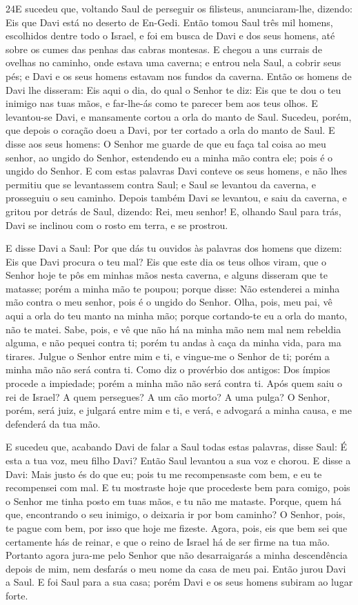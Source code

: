 \lettrine{24} E sucedeu que, voltando Saul de perseguir os
filisteus, anunciaram-lhe, dizendo: Eis que Davi está no deserto de
En-Gedi. Então tomou Saul três mil homens, escolhidos dentre
todo o Israel, e foi em busca de Davi e dos seus homens, até sobre
os cumes das penhas das cabras montesas. E chegou a uns currais
de ovelhas no caminho, onde estava uma caverna; e entrou nela Saul,
a cobrir seus pés; e Davi e os seus homens estavam nos fundos da
caverna. Então os homens de Davi lhe disseram: Eis aqui o dia,
do qual o Senhor te diz: Eis que te dou o teu inimigo nas tuas mãos,
e far-lhe-ás como te parecer bem aos teus olhos. E levantou-se Davi,
e mansamente cortou a orla do manto de Saul. Sucedeu, porém, que
depois o coração doeu a Davi, por ter cortado a orla do manto de
Saul. E disse aos seus homens: O Senhor me guarde de que eu faça
tal coisa ao meu senhor, ao ungido do Senhor, estendendo eu a minha
mão contra ele; pois é o ungido do Senhor. E com estas palavras
Davi conteve os seus homens, e não lhes permitiu que se levantassem
contra Saul; e Saul se levantou da caverna, e prosseguiu o seu
caminho. Depois também Davi se levantou, e saiu da caverna, e
gritou por detrás de Saul, dizendo: Rei, meu senhor! E, olhando Saul
para trás, Davi se inclinou com o rosto em terra, e se prostrou.

E disse Davi a Saul: Por que dás tu ouvidos às palavras dos homens
que dizem: Eis que Davi procura o teu mal? Eis que este dia
os teus olhos viram, que o Senhor hoje te pôs em minhas mãos nesta
caverna, e alguns disseram que te matasse; porém a minha mão te
poupou; porque disse: Não estenderei a minha mão contra o meu
senhor, pois é o ungido do Senhor. Olha, pois, meu pai, vê
aqui a orla do teu manto na minha mão; porque cortando-te eu a orla
do manto, não te matei. Sabe, pois, e vê que não há na minha mão nem
mal nem rebeldia alguma, e não pequei contra ti; porém tu andas à
caça da minha vida, para ma tirares. Julgue o Senhor entre
mim e ti, e vingue-me o Senhor de ti; porém a minha mão não será
contra ti. Como diz o provérbio dos antigos: Dos ímpios
procede a impiedade; porém a minha mão não será contra ti.
Após quem saiu o rei de Israel? A quem persegues? A um cão
morto? A uma pulga? O Senhor, porém, será juiz, e julgará
entre mim e ti, e verá, e advogará a minha causa, e me defenderá da
tua mão.

E sucedeu que, acabando Davi de falar a Saul todas estas
palavras, disse Saul: É esta a tua voz, meu filho Davi? Então Saul
levantou a sua voz e chorou. E disse a Davi: Mais justo és do
que eu; pois tu me recompensaste com bem, e eu te recompensei com
mal. E tu mostraste hoje que procedeste bem para comigo, pois
o Senhor me tinha posto em tuas mãos, e tu não me mataste.
Porque, quem há que, encontrando o seu inimigo, o deixaria ir
por bom caminho? O Senhor, pois, te pague com bem, por isso que hoje
me fizeste. Agora, pois, eis que bem sei que certamente hás
de reinar, e que o reino de Israel há de ser firme na tua mão.
Portanto agora jura-me pelo Senhor que não desarraigarás a
minha descendência depois de mim, nem desfarás o meu nome da casa de
meu pai. Então jurou Davi a Saul. E foi Saul para a sua casa;
porém Davi e os seus homens subiram ao lugar forte.

